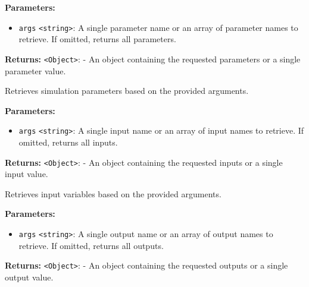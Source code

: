 \documentclass[12pt,a4paper]{article}
\begin{document}
\vspace{5mm}
\noindent {}


\noindent \textbf{Parameters:}
\begin{itemize}
  \item \texttt{args} \texttt{<string>}: A single parameter name or an array of parameter names to retrieve. If omitted, returns all parameters.
\end{itemize}

\noindent \textbf{Returns:} \texttt{<Object>}: - An object containing the requested parameters or a single parameter value.

\noindent Retrieves simulation parameters based on the provided arguments.

\vspace{5mm}
\noindent {}


\noindent \textbf{Parameters:}
\begin{itemize}
  \item \texttt{args} \texttt{<string>}: A single input name or an array of input names to retrieve. If omitted, returns all inputs.
\end{itemize}

\noindent \textbf{Returns:} \texttt{<Object>}: - An object containing the requested inputs or a single input value.

\noindent Retrieves input variables based on the provided arguments.

\vspace{5mm}
\noindent {}


\noindent \textbf{Parameters:}
\begin{itemize}
  \item \texttt{args} \texttt{<string>}: A single output name or an array of output names to retrieve. If omitted, returns all outputs.
\end{itemize}

\noindent \textbf{Returns:} \texttt{<Object>}: - An object containing the requested outputs or a single output value.
\end{document}
